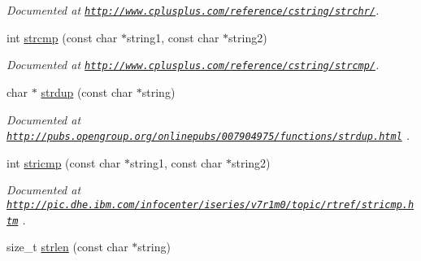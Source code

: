 \begin{DoxyCompactItemize}
\begin{DoxyCompactList}\small\item\em Documented at \href{http://www.cplusplus.com/reference/cstring/strchr/}{\tt http\-://www.\-cplusplus.\-com/reference/cstring/strchr/}. \end{DoxyCompactList}\item 
\hypertarget{group__string_ga04ee58caa7e5071bb02f298a1921a5f4}{int \hyperlink{group__string_ga04ee58caa7e5071bb02f298a1921a5f4}{strcmp} (const char $\ast$string1, const char $\ast$string2)}\label{group__string_ga04ee58caa7e5071bb02f298a1921a5f4}

\begin{DoxyCompactList}\small\item\em Documented at \href{http://www.cplusplus.com/reference/cstring/strcmp/}{\tt http\-://www.\-cplusplus.\-com/reference/cstring/strcmp/}. \end{DoxyCompactList}\item 
\hypertarget{group__string_ga86e0df1bf9e434074f958434e0af7581}{char $\ast$ \hyperlink{group__string_ga86e0df1bf9e434074f958434e0af7581}{strdup} (const char $\ast$string)}\label{group__string_ga86e0df1bf9e434074f958434e0af7581}

\begin{DoxyCompactList}\small\item\em Documented at \href{http://pubs.opengroup.org/onlinepubs/007904975/functions/strdup.html}{\tt http\-://pubs.\-opengroup.\-org/onlinepubs/007904975/functions/strdup.\-html} . \end{DoxyCompactList}\item 
\hypertarget{group__string_ga156d6d978e1b69f06ca817323ab7751d}{int \hyperlink{group__string_ga156d6d978e1b69f06ca817323ab7751d}{stricmp} (const char $\ast$string1, const char $\ast$string2)}\label{group__string_ga156d6d978e1b69f06ca817323ab7751d}

\begin{DoxyCompactList}\small\item\em Documented at \href{http://pic.dhe.ibm.com/infocenter/iseries/v7r1m0/topic/rtref/stricmp.htm}{\tt http\-://pic.\-dhe.\-ibm.\-com/infocenter/iseries/v7r1m0/topic/rtref/stricmp.\-htm} . \end{DoxyCompactList}\item 
\hypertarget{group__string_ga2869404e70f06f4477271f26ce8c4920}{size\-\_\-t \hyperlink{group__string_ga2869404e70f06f4477271f26ce8c4920}{strlen} (const char $\ast$string)}\label{group__string_ga2869404e70f06f4477271f26ce8c4920}


\end{DoxyCompactItemize}
